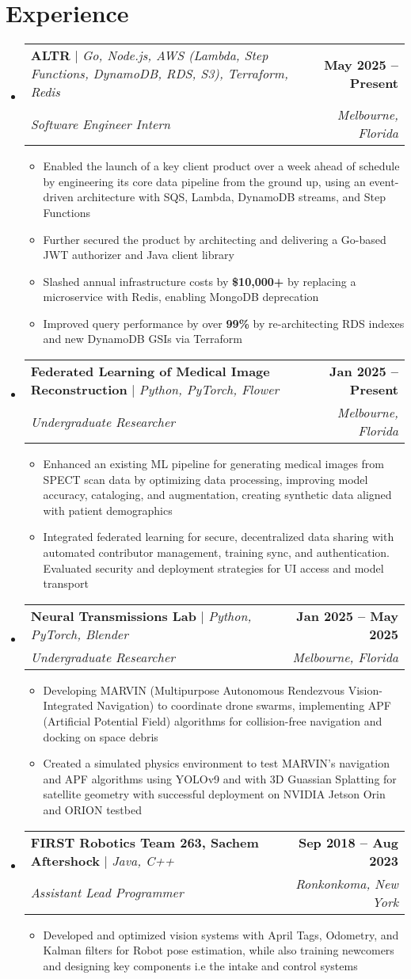 \documentclass[letterpaper,11pt]{article}
\makeatletter
\newcommand{\resumeItem}[1]{
  \item\small{
    {#1 \vspace{-2pt}}
  }
}
\newcommand{\resumeSubheading}[4]{
  \vspace{-2pt}\item
    \begin{tabular*}{1.0\textwidth}[t]{l@{\extracolsep{\fill}}r}
      \small#1 & \textbf{\small #2} \\
      \textit{\small#3} & \textit{\small #4} \\
    \end{tabular*}\vspace{-9pt}
}
\newcommand{\resumeSubHeadingListStart}{\begin{itemize}[leftmargin=0.0in, label={}]}
\newcommand{\resumeSubHeadingListEnd}{\end{itemize}}
\newcommand{\resumeItemListStart}{\begin{itemize}}
\newcommand{\resumeItemListEnd}{\end{itemize}\vspace{-5pt}}
\makeatother
\begin{document}
\section{Experience}
  \resumeSubHeadingListStart
    \vspace{0pt}
    \resumeSubheading
      {\textbf{ALTR} $|$ \emph{Go, Node.js, AWS (Lambda, Step Functions, DynamoDB, RDS, S3), Terraform, Redis}}{May 2025 -- Present}
      {Software Engineer Intern}{Melbourne, Florida}
      \resumeItemListStart
        \resumeItem{Enabled the launch of a key client product over a week ahead of schedule by engineering its core data pipeline from the ground up, using an event-driven architecture with SQS, Lambda, DynamoDB streams, and Step Functions}
        \resumeItem{Further secured the product by architecting and delivering a Go-based JWT authorizer and Java client library}
        \resumeItem{Slashed annual infrastructure costs by \textbf{\$10,000+} by replacing a microservice with Redis, enabling MongoDB deprecation}
        \resumeItem{Improved query performance by over \textbf{99\%} by re-architecting RDS indexes and new DynamoDB GSIs via Terraform}
      \resumeItemListEnd
    \vspace{0pt}
    \resumeSubheading
      {\textbf{Federated Learning of Medical Image Reconstruction} $|$ \emph{Python, PyTorch, Flower}}{Jan 2025 -- Present}
      {Undergraduate Researcher}{Melbourne, Florida}
      \resumeItemListStart
        \resumeItem{Enhanced an existing ML pipeline for generating medical images from SPECT scan data by optimizing data processing, improving model accuracy, cataloging, and augmentation, creating synthetic data aligned with patient demographics}
        \resumeItem{Integrated federated learning for secure, decentralized data sharing with automated contributor management, training sync, and authentication. Evaluated security and deployment strategies for UI access and model transport}
      \resumeItemListEnd
    \vspace{0pt}
    \resumeSubheading
      {\textbf{Neural Transmissions Lab} $|$ \emph{Python, PyTorch, Blender}}{Jan 2025 -- May 2025}      
      {Undergraduate Researcher}{Melbourne, Florida}
      \resumeItemListStart
        \resumeItem{Developing MARVIN (Multipurpose Autonomous Rendezvous Vision-Integrated Navigation) to coordinate drone swarms, implementing APF (Artificial Potential Field) algorithms for collision-free navigation and docking on space debris}
        \resumeItem{Created a simulated physics environment to test MARVIN's navigation and APF algorithms using YOLOv9 and with 3D Guassian Splatting for satellite geometry with successful deployment on NVIDIA Jetson Orin and ORION testbed}
      \resumeItemListEnd
    \vspace{0pt}
    \resumeSubheading
      {\textbf{FIRST Robotics Team 263, Sachem Aftershock} $|$ \emph{Java, C++}}{Sep 2018 -- Aug 2023}
      {Assistant Lead Programmer}{Ronkonkoma, New York}
      \resumeItemListStart
        \resumeItem{Developed and optimized vision systems with April Tags, Odometry, and Kalman filters for Robot pose estimation, while also training newcomers and designing key components i.e the intake and control systems}
      \resumeItemListEnd
  \resumeSubHeadingListEnd
\end{document}

